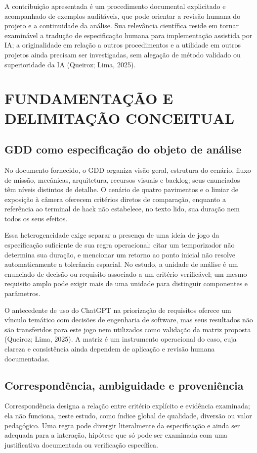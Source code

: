 A contribuição apresentada é um procedimento documental explicitado e acompanhado de exemplos auditáveis, que pode orientar a revisão humana do projeto e a continuidade da análise. Sua relevância científica reside em tornar examinável a tradução de especificação humana para implementação assistida por IA; a originalidade em relação a outros procedimentos e a utilidade em outros projetos ainda precisam ser investigadas, sem alegação de método validado ou superioridade da IA (Queiroz; Lima, 2025).

\section{FUNDAMENTAÇÃO E DELIMITAÇÃO CONCEITUAL}
\subsection{GDD como especificação do objeto de análise}
No documento fornecido, o GDD organiza visão geral, estrutura do cenário, fluxo de missão, mecânicas, arquitetura, recursos visuais e backlog; seus enunciados têm níveis distintos de detalhe. O cenário de quatro pavimentos e o limiar de exposição à câmera oferecem critérios diretos de comparação, enquanto a referência ao terminal de hack não estabelece, no texto lido, sua duração nem todos os seus efeitos.

Essa heterogeneidade exige separar a presença de uma ideia de jogo da especificação suficiente de sua regra operacional: citar um temporizador não determina sua duração, e mencionar um retorno ao ponto inicial não resolve automaticamente a tolerância espacial. No estudo, a unidade de análise é um enunciado de decisão ou requisito associado a um critério verificável; um mesmo requisito amplo pode exigir mais de uma unidade para distinguir componentes e parâmetros.

O antecedente de uso do ChatGPT na priorização de requisitos oferece um vínculo temático com decisões de engenharia de software, mas seus resultados não são transferidos para este jogo nem utilizados como validação da matriz proposta (Queiroz; Lima, 2025). A matriz é um instrumento operacional do caso, cuja clareza e consistência ainda dependem de aplicação e revisão humana documentadas.

\subsection{Correspondência, ambiguidade e proveniência}
Correspondência designa a relação entre critério explícito e evidência examinada; ela não funciona, neste estudo, como índice global de qualidade, diversão ou valor pedagógico. Uma regra pode divergir literalmente da especificação e ainda ser adequada para a interação, hipótese que só pode ser examinada com uma justificativa documentada ou verificação específica.


